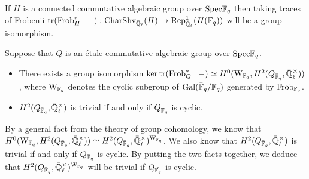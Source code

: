                 \begin{lemma} \label{lemma: sheaf_function_correspondence_for_connected_algebraic_groups}
                    \cite[Proposition 1.14]{cunningham_roe_function_sheaf_dictionary_quasi_characters_p_adic_tori} If $H$ is a connected commutative algebraic group over $\mathrm{Spec} \mathbb{F}_q$ then taking traces of Frobenii $\operatorname{tr}(\mathrm{Frob}_H^* \mid -): \mathrm{Char}\mathrm{Shv}_{\bar{\mathbb{Q}}_{\ell}}(H) \to \mathrm{Rep}_{\bar{\mathbb{Q}}_{\ell}}^1(H(\mathbb{F}_q))$ will be a group isomorphism.
                \end{lemma}
                \begin{lemma} \label{lemma: sheaf_function_correspondence_for_etale_commutative_group_schemes}
                    Suppose that $Q$ is an \'etale commutative algebraic group over $\mathrm{Spec} \mathbb{F}_q$.
                    \begin{itemize}
                        \item \cite[Proposition 2.7]{cunningham_roe_function_sheaf_dictionary_quasi_characters_p_adic_tori} There exists a group isomorphism $\ker \trace(\Frob_Q^* \mid -) \cong H^0(\rmW_{\F_q}, H^2(Q_{\bar{\F}_q}, \bar{\Q}_{\ell}^{\x}))$, where $\mathrm{W}_{\mathbb{F}_q}$ denotes the cyclic subgroup of $\mathrm{Gal}(\bar{\mathbb{F}}_q/\mathbb{F}_q)$ generated by $\mathrm{Frob}_{\mathbb{F}_q}$. 
                        \item \cite[Remark 2.9]{cunningham_roe_function_sheaf_dictionary_quasi_characters_p_adic_tori} $H^2(Q_{\bar{\F}_q}, \bar{\Q}_{\ell}^{\x})$ is trivial if and only if $Q_{\bar{\mathbb{F}}_q}$ is cyclic.
                    \end{itemize}
                \end{lemma}
                \begin{corollary} \label{coro: kernels_of_traces_of_frobenii_on_etale_group_schemes}
                    By a general fact from the theory of group cohomology, we know that $H^0(\rmW_{\F_q}, H^2(Q_{\bar{\F}_q}, \bar{\Q}_{\ell}^{\x})) \cong H^2(Q_{\bar{\F}_q}, \bar{\Q}_{\ell}^{\x})^{\rmW_{\F_q}}$. We also know that $H^2(Q_{\bar{\F}_q}, \bar{\Q}_{\ell}^{\x})$ is trivial if and only if $Q_{\bar{\mathbb{F}}_q}$ is cyclic. By putting the two facts together, we deduce that $H^2(Q_{\bar{\F}_q}, \bar{\Q}_{\ell}^{\x})^{\rmW_{\F_q}}$ will be trivial if $Q_{\bar{\mathbb{F}_q}}$ is cyclic. 
                \end{corollary}
                
